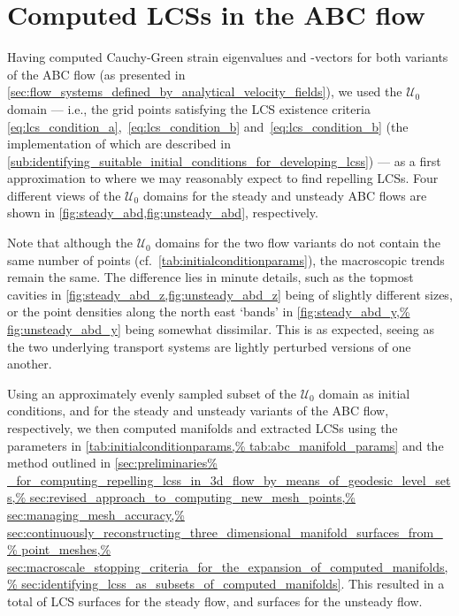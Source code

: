 \section{Computed LCSs in the ABC flow}
\label{sec:computed_lcss_in_the_abc_flow}

Having computed Cauchy-Green strain eigenvalues and -vectors for both
variants of the ABC flow (as presented in
\cref{sec:flow_systems_defined_by_analytical_velocity_fields}), we used
the $\mathcal{U}_{0}$ domain --- i.e., the grid points satisfying the LCS
existence criteria~ \eqref{eq:lcs_condition_a},~\eqref{eq:lcs_condition_b}
and~\eqref{eq:lcs_condition_b} (the implementation of which are
described in
\cref{sub:identifying_suitable_initial_conditions_for_developing_lcss}) --- as
a first approximation to where we may reasonably expect to find repelling LCSs.
Four different views of the $\mathcal{U}_{0}$ domains for the steady
and unsteady ABC flows are shown in \cref{fig:steady_abd,fig:unsteady_abd},
respectively.





Note that although the $\mathcal{U}_{0}$ domains for the two
flow variants do not contain the same number of points (cf.\
\cref{tab:initialconditionparams}), the macroscopic trends remain the same. The
difference lies in minute details, such as the topmost cavities in
\cref{fig:steady_abd_z,fig:unsteady_abd_z} being of slightly different sizes,
or the point densities along the north east `bands' in \cref{fig:steady_abd_y,%
fig:unsteady_abd_y} being somewhat dissimilar. This is as expected, seeing
as the two underlying transport systems are lightly perturbed versions of
one another.

Using an approximately evenly sampled subset of the $\mathcal{U}_{0}$ domain
as initial conditions, \numprint{618} and \numprint{676} for the steady
and unsteady variants of the ABC flow, respectively, we then computed manifolds
and extracted LCSs using the parameters in \cref{tab:initialconditionparams,%
tab:abc_manifold_params} and the method outlined in \cref{sec:preliminaries%
_for_computing_repelling_lcss_in_3d_flow_by_means_of_geodesic_level_sets,%
    sec:revised_approach_to_computing_new_mesh_points,%
    sec:managing_mesh_accuracy,%
    sec:continuously_reconstructing_three_dimensional_manifold_surfaces_from_%
    point_meshes,%
    sec:macroscale_stopping_criteria_for_the_expansion_of_computed_manifolds,%
    sec:identifying_lcss_as_subsets_of_computed_manifolds}. This resulted
in a total of \numprint{22} LCS surfaces for the steady flow, and
\numprint{31} surfaces for the unsteady flow.


